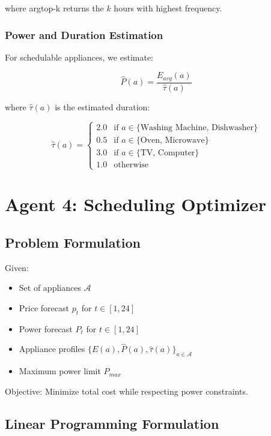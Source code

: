 \documentclass[conference]{IEEEtran}
\begin{document}
where argtop-k returns the $k$ hours with highest frequency.

\subsubsection{Power and Duration Estimation}
For schedulable appliances, we estimate:

\begin{equation}
\hat{P}(a) = \frac{E_{avg}(a)}{\hat{\tau}(a)}
\end{equation}

where $\hat{\tau}(a)$ is the estimated duration:

\begin{equation}
\hat{\tau}(a) = \begin{cases}
2.0 & \text{if } a \in \{\text{Washing Machine, Dishwasher}\} \\
0.5 & \text{if } a \in \{\text{Oven, Microwave}\} \\
3.0 & \text{if } a \in \{\text{TV, Computer}\} \\
1.0 & \text{otherwise}
\end{cases}
\end{equation}

\section{Agent 4: Scheduling Optimizer}

\subsection{Problem Formulation}
Given:
\begin{itemize}
    \item Set of appliances $\mathcal{A}$
    \item Price forecast $p_t$ for $t \in [1, 24]$
    \item Power forecast $P_t$ for $t \in [1, 24]$
    \item Appliance profiles $\{E(a), \hat{P}(a), \hat{\tau}(a)\}_{a \in \mathcal{A}}$
    \item Maximum power limit $P_{max}$
\end{itemize}

Objective: Minimize total cost while respecting power constraints.

\subsection{Linear Programming Formulation}
\end{document}
